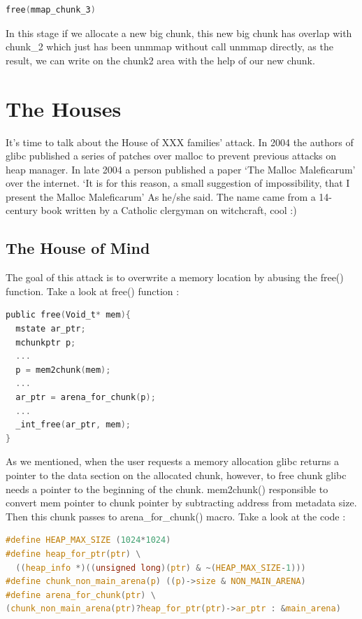 \documentclass{masterthesis}
\newcommand*\libc{glibc}
\begin{document}
\begin{lstlisting}[language=c,frame=tlrb]
free(mmap_chunk_3)
 \end{lstlisting}
 
In this stage if we allocate a new big chunk, this new big chunk has overlap with chunk\_2 which just has been unmmap without call unmmap directly, as the result, we can write on the chunk2 area with the help of our new chunk.

\section{The Houses}

It's time to talk about the House of XXX families' attack. In 2004 the authors of \libc{} published a series of patches over malloc to prevent previous attacks on heap manager. In late 2004 a person published a paper ‘The Malloc Maleficarum’ over the internet. ‘It is for this reason, a small suggestion of impossibility, that I present the Malloc Maleficarum’ As he/she said. The name came from a 14-century book written by a Catholic clergyman on witchcraft, cool :)

\subsection{The House of Mind}
The goal of this attack is to overwrite a memory location by abusing the free() function. Take a look at free() function : 
\begin{lstlisting}[language=c,frame=tlrb]
public free(Void_t* mem){
  mstate ar_ptr;
  mchunkptr p;    
  ...
  p = mem2chunk(mem);
  ...
  ar_ptr = arena_for_chunk(p);
  ...
  _int_free(ar_ptr, mem);
}
 \end{lstlisting}
As we mentioned, when the user requests a memory allocation \libc{} returns a pointer to the data section on the allocated chunk, however, to free chunk \libc{} needs a pointer to the beginning of the chunk. mem2chunk() responsible to convert mem pointer to chunk pointer by subtracting address from metadata size. Then this chunk passes to arena\_for\_chunk() macro. Take a look at the code : 

\begin{lstlisting}[language=c,frame=tlrb]
#define HEAP_MAX_SIZE (1024*1024)
#define heap_for_ptr(ptr) \
  ((heap_info *)((unsigned long)(ptr) & ~(HEAP_MAX_SIZE-1)))
#define chunk_non_main_arena(p) ((p)->size & NON_MAIN_ARENA)
#define arena_for_chunk(ptr) \
(chunk_non_main_arena(ptr)?heap_for_ptr(ptr)->ar_ptr : &main_arena)
 \end{lstlisting}
 
\end{document}
